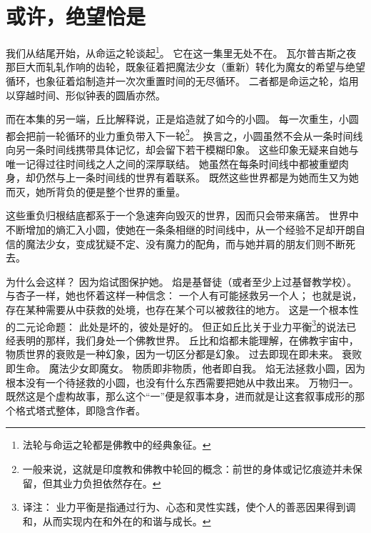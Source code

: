 \chapter[或许，绝望恰是]{或许，绝望恰是}



我们从结尾开始，从命运之轮谈起\footnote{%
    法轮与命运之轮都是佛教中的经典象征。
}\cite{smart1998buddhism}。
它在这一集里无处不在。
瓦尔普吉斯之夜那巨大而轧轧作响的齿轮，既象征着把魔法少女（重新）转化为魔女的希望与绝望循环，也象征着焰制造并一次次重置时间的无尽循环。
二者都是命运之轮，焰用以穿越时间、形似钟表的圆盾亦然。

而在本集的另一端，丘比解释说，正是焰造就了如今的小圆。
每一次重生，小圆都会把前一轮循环的业力重负带入下一轮\footnote{%
    一般来说，这就是印度教和佛教中轮回的概念：前世的身体或记忆痕迹并未保留，但其业力负担依然存在。
}\cite{smart1998ingredients-indian-religion}。
换言之，小圆虽然不会从一条时间线向另一条时间线携带具体记忆，却会留下若干模糊印象。
这些印象无疑来自她与唯一记得过往时间线之人之间的深厚联结。
她虽然在每条时间线中都被重塑肉身，却仍然与上一条时间线的世界有着联系。
既然这些世界都是为她而生又为她而灭，她所背负的便是整个世界的重量。

这些重负归根结底都系于一个急速奔向毁灭的世界，因而只会带来痛苦\cite{smart1998buddhism}。
世界中不断增加的熵汇入小圆，使她在一条条相继的时间线中，从一个经验不足却开朗自信的魔法少女，变成犹疑不定、没有魔力的配角，而与她并肩的朋友们则不断死去。

为什么会这样？
因为焰试图保护她。
焰是基督徒（或者至少上过基督教学校）。
与杏子一样，她也怀着这样一种信念：
一个人有可能拯救另一个人；
也就是说，存在某种需要从中获救的处境，也存在某个可以被救往的地方。
这是一个根本性的二元论命题：
此处是坏的，彼处是好的。
但正如丘比关于业力平衡\footnote{%
    译注：
    业力平衡是指通过行为、心态和灵性实践，使个人的善恶因果得到调和，从而实现内在和外在的和谐与成长。
}的说法已经表明的那样，我们身处一个佛教世界。
丘比和焰都未能理解，在佛教宇宙中，物质世界的衰败是一种幻象，因为一切区分都是幻象\cite{smart1998formation-zen}。
过去即现在即未来。
衰败即生命。
魔法少女即魔女。
物质即非物质，他者即自我。
焰无法拯救小圆，因为根本没有一个待拯救的小圆，也没有什么东西需要把她从中救出来。
万物归一。
既然这是个虚构故事，那么这个“一”便是叙事本身，进而就是让这套叙事成形的那个格式塔式整体，即隐含作者。

